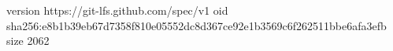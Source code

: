 version https://git-lfs.github.com/spec/v1
oid sha256:e8b1b39eb67d7358f810e05552dc8d367ce92e1b3569c6f262511bbe6afa3efb
size 2062
